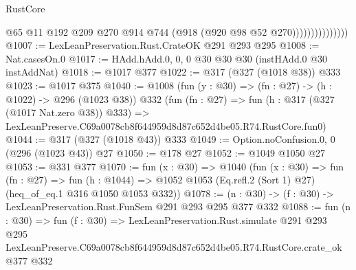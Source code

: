 \begin{lexlean}{RustCore}
\begin{coremodule}
                              @65
                              @11
                              @192
                              @209
                              @270
                              @914
                              @744
                              (@918 (@920 @98 @52 @270)))))))))))))))
@1007 := LexLeanPreservation.Rust.CrateOK @291 @293 @295
@1008 := Nat.casesOn.{0}
@1017 := HAdd.hAdd.{0, 0, 0} @30 @30 @30 (instHAdd.{0} @30 instAddNat)
@1018 := @1017 @377
@1022 := @317 (@327 (@1018 @38)) @333
@1023 := @1017 @375
@1040 := @1008
    (fun (y : @30) => (fn : @27) -> (h : @1022) -> @296 (@1023 @38))
    @332
    (fun (fn : @27) =>
    fun (h : @317 (@327 (@1017 Nat.zero @38)) @333) =>
    LexLeanPreserve.C69a0078cb8f644959d8d87c652d4be05.R74.RustCore.fun0)
@1044 := @317 (@327 (@1018 @43)) @333
@1049 := Option.noConfusion.{0, 0} (@296 (@1023 @43)) @27
@1050 := @178 @27
@1052 := @1049 @1050 @27
@1053 := @331 @377
@1070 := fun (x : @30) =>
  @1040
    (fun (x : @30) =>
    fun (fn : @27) =>
    fun (h : @1044) => @1052 @1053 (Eq.refl.{2} (Sort 1) @27) (heq_of_eq.{1} @316 @1050 @1053 @332))
@1078 := (n : @30) -> (f : @30) -> LexLeanPreservation.Rust.FunSem @291 @293 @295 @377 @332
@1088 := fun (n : @30) =>
  fun (f : @30) =>
  LexLeanPreservation.Rust.simulate
    @291
    @293
    @295
    LexLeanPreserve.C69a0078cb8f644959d8d87c652d4be05.R74.RustCore.crate_ok
    @377
    @332
\end{coremodule}
\end{lexlean}
